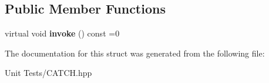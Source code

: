 \subsection*{Public Member Functions}
\begin{DoxyCompactItemize}
\item 
virtual void {\bfseries invoke} () const =0\hypertarget{structCatch_1_1ITestCase_a678825e62e7c17297621cfeb65588c34}{}\label{structCatch_1_1ITestCase_a678825e62e7c17297621cfeb65588c34}

\end{DoxyCompactItemize}


The documentation for this struct was generated from the following file\+:\begin{DoxyCompactItemize}
\item 
Unit Tests/C\+A\+T\+C\+H.\+hpp\end{DoxyCompactItemize}
